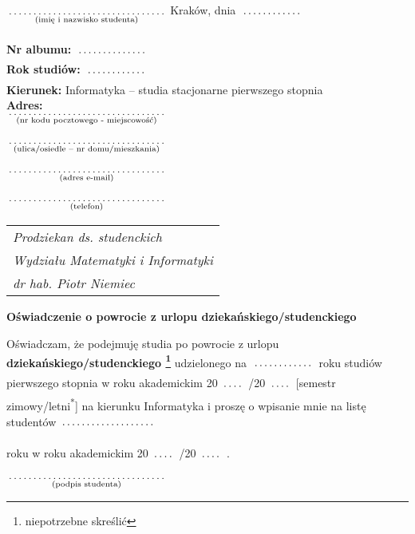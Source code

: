 \documentclass[a4paper,11pt]{article}
\newcommand{\fillField}[2]{
    $\underset{\text{#1}}{\parbox[t]{#2}{\dotfill}}$
}
\begin{document}
\noindent
\fillField{(imię i nazwisko studenta)}{5cm} \hfill Kraków, dnia \fillField{}{2cm} \\\\
\textbf{Nr albumu:}   \fillField{}{2.3cm}\\
\textbf{Rok studiów:} \fillField{}{2cm}\\
\textbf{Kierunek:} Informatyka -- studia stacjonarne pierwszego stopnia\\
\textbf{Adres:}\\
\fillField{(nr kodu pocztowego - miejscowość)}{5cm}\\\\
\fillField{(ulica/osiedle – nr domu/mieszkania)}{5cm}\\\\
\fillField{(adres e-mail)}{5cm}\\\\
\fillField{(telefon)}{5cm}


\phantom{a}\hfill
\begin{tabular}[c]{@{}l@{}}
\textit{Prodziekan ds. studenckich} \\
\textit{Wydziału Matematyki i Informatyki}\\
\textit{dr hab. Piotr Niemiec}
\end{tabular}

\vskip 2.0cm

\begin{center}
{\Large \textbf{Oświadczenie o powrocie z urlopu dziekańskiego/studenckiego}}
\end{center}

\vskip 0.5cm

Oświadczam, że podejmuję studia po powrocie z urlopu \textbf{dziekańskiego/studenckiego
\footnote[1]{niepotrzebne skreślić}} udzielonego na \fillField{}{2cm} roku
studiów pierwszego stopnia w roku akademickim 20\fillField{}{0.7cm}/20\fillField{}{0.7cm} [semestr zimowy/letni\textsuperscript{*}]
na kierunku Informatyka i proszę o wpisanie mnie na listę studentów \fillField{}{3cm}
roku w roku akademickim 20\fillField{}{0.7cm}/20\fillField{}{0.7cm}.

\vskip 2.0cm

\hspace{\fill} \fillField{(podpis studenta)}{5cm} \hspace{2.0cm}
\end{document}
